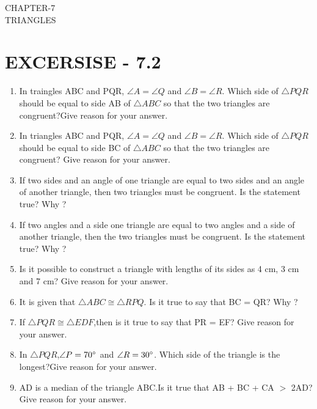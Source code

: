 \documentclass[12pt]{article}
\begin{document}
\begin{center}
\textbf\large{CHAPTER-7  \\  TRIANGLES}
\section*{EXCERSISE - 7.2}
\end{center}

\begin{enumerate}

\item In traingles ABC and PQR, $ \angle{A} = \angle{Q} $ and $ \angle{B} = \angle{R} $. Which side of $ \triangle{PQR} $ should be equal to side AB of $ \triangle{ABC} $ so that the two triangles are congruent?Give reason for your answer.

\item In triangles ABC and PQR, $ \angle{A} = \angle{Q} $ and $ \angle{B} = \angle{R} $. Which side of $ \triangle{PQR} $should be equal to side BC of $ \triangle{ABC} $ so that the two triangles are congruent? Give reason for your answer.

\item If two sides and an angle of one triangle are equal to two sides and an angle of another triangle, then two triangles must be congruent. Is the statement true? Why ?

\item If two angles and a side one triangle are equal to two angles and a side of another triangle, then the two triangles must be congruent. Is the statement true? Why ?

\item Is it possible to construct a triangle with lengths of its sides as 4 cm, 3 cm and 7 cm? Give reason for your answer.

\item It is given that $ \triangle{ABC} \cong \triangle{RPQ} $. Is it true to say that BC = QR? Why ?

\item If $ \triangle{PQR} \cong \triangle{EDF} $,then is it true to say that PR = EF? Give reason for your answer.

\item In $ \triangle{PQR} $,$ \angle{P} = 70\degree $ and $ \angle{R} = 30\degree $. Which side of the triangle is the longest?Give reason for your answer.

\item AD is a median of the triangle ABC.Is it true that AB + BC + CA $ > $ 2AD? Give reason for your answer.


\end{enumerate}
\end{document}
